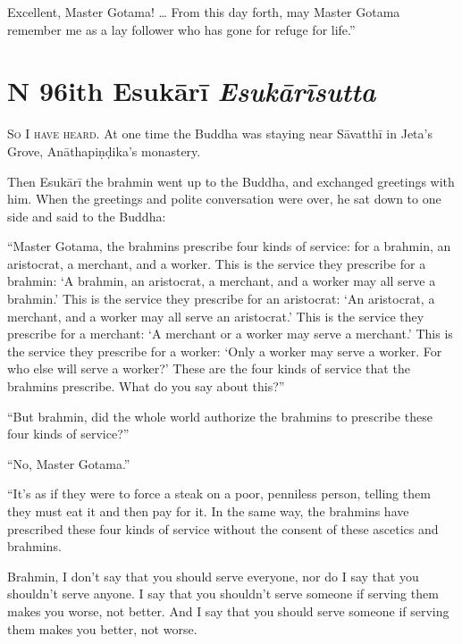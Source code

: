 \documentclass[12pt,openany]{book}%
\newcommand*{\suttatitleacronym}[1]{\smaller[2]{#1}\vspace*{.3em}}
\newcommand*{\suttatitletranslation}[1]{\linebreak{#1}}
\newcommand*{\suttatitleroot}[1]{\linebreak\smaller[2]\itshape{#1}}
\newcommand*{\tocacronym}[1]{\hspace*{-3.3em}{#1}\quad}
\newcommand*{\toctranslation}[1]{#1}
\newcommand*{\tocroot}[1]{(\textit{#1})}
\newcommand*{\scevam}[1]{\textsc{#1}}
\begin{document}
Excellent, Master Gotama! … From this day forth, may Master Gotama remember me as a lay follower who has gone for refuge for life.” 

%
\section*{{\suttatitleacronym MN 96}{\suttatitletranslation With Esukārī }{\suttatitleroot Esukārīsutta}}
\addcontentsline{toc}{section}{\tocacronym{MN 96} \toctranslation{With Esukārī } \tocroot{Esukārīsutta}}

\scevam{So I have heard. }At one time the Buddha was staying near \textsanskrit{Sāvatthī} in Jeta’s Grove, \textsanskrit{Anāthapiṇḍika}’s monastery. 

Then \textsanskrit{Esukārī} the brahmin went up to the Buddha, and exchanged greetings with him. When the greetings and polite conversation were over, he sat down to one side and said to the Buddha: 

“Master Gotama, the brahmins prescribe four kinds of service: for a brahmin, an aristocrat, a merchant, and a worker. This is the service they prescribe for a brahmin: ‘A brahmin, an aristocrat, a merchant, and a worker may all serve a brahmin.’ This is the service they prescribe for an aristocrat: ‘An aristocrat, a merchant, and a worker may all serve an aristocrat.’ This is the service they prescribe for a merchant: ‘A merchant or a worker may serve a merchant.’ This is the service they prescribe for a worker: ‘Only a worker may serve a worker. For who else will serve a worker?’ These are the four kinds of service that the brahmins prescribe. What do you say about this?” 

“But brahmin, did the whole world authorize the brahmins to prescribe these four kinds of service?” 

“No, Master Gotama.” 

“It’s as if they were to force a steak on a poor, penniless person, telling them they must eat it and then pay for it. In the same way, the brahmins have prescribed these four kinds of service without the consent of these ascetics and brahmins. 

Brahmin, I don’t say that you should serve everyone, nor do I say that you shouldn’t serve anyone. I say that you shouldn’t serve someone if serving them makes you worse, not better. And I say that you should serve someone if serving them makes you better, not worse. 
\end{document}
